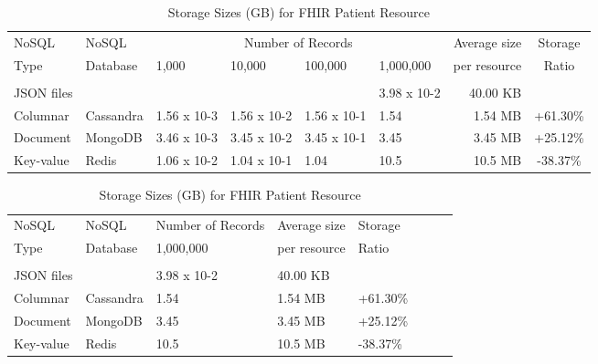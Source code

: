 \begin{table*}[ht]															
    \centering															
    \caption{Storage Sizes (GB) for FHIR Patient Resource}															
    \label{table.storage}															
    \begin{tabular}{llllllrc}   
        \toprule															
            NoSQL	&	NoSQL	&	\multicolumn{4}{c}{Number of Records}							&	Average size	&	Storage	\\
            Type	&	Database	&	1,000	&	10,000	&	100,000	&	1,000,000	&	per resource	&	Ratio	\\
        \hline	&		&		&		&		&		&		&		\\
            JSON files	&		&		&		&		&	 3.98 x 10-2	&	40.00 KB	&		\\
            Columnar	&	Cassandra	&	1.56 x 10-3	&	1.56 x 10-2	&	1.56 x 10-1	&	1.54	&	1.54 MB	&	+61.30\%	\\
            Document	&	MongoDB	&	3.46 x 10-3	&	3.45 x 10-2	&	3.45 x 10-1	&	3.45	&	3.45 MB	&	+25.12\%	\\
            Key-value	&	Redis	&	1.06 x 10-2	&	1.04 x 10-1	&	1.04	&	10.5	&	10.5 MB	&	-38.37\%	\\
        \hline
    \end{tabular}															
\end{table*}		


\begin{table}[ht]															
    \centering															
    \caption{Storage Sizes (GB) for FHIR Patient Resource}															
    \label{table.storage}															
    \begin{tabular}{llllllrc}   
        \toprule															
            NoSQL	    &	NoSQL	    &	Number of Records	&	Average size	&	Storage	\\
            Type	    &	Database	&   1,000,000           &	per resource	&	Ratio	\\
        \hline	
            &		    &		        &		                &				    &		       \\
            JSON files	&		        & 3.98 x 10-2	        &	40.00 KB	    &		        \\
            Columnar	&	Cassandra	& 1.54	                &	1.54 MB	        &	+61.30\%	\\
            Document	&	MongoDB		& 3.45	                &	3.45 MB	        &	+25.12\%	\\
            Key-value	&	Redis	    & 10.5	                &	10.5 MB	        &	-38.37\%	\\
        \hline
    \end{tabular}															
\end{table}		


